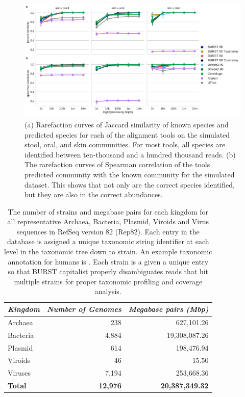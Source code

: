 \begin{figure}[hbt]
    \centering
    \includegraphics[width=0.8\linewidth]{fig/simulations_js.pdf}
    \caption{
          (a) Rarefaction curves of Jaccard similarity of known species and predicted species for each of the alignment tools on the simulated stool, oral, and skin communities. For most tools, all species are identified between ten-thousand and a hundred thousand reads. (b) The rarefaction curves of Spearman correlation of the tools predicted community with the known community for the simulated dataset. This shows that not only are the correct species identified, but they are also in the correct abundances. 
    }
    \label{fig:simulations_js}
\end{figure}

\begin{table}[hbt]
  \centering
  \begin{tabular}{l|r|r}
      \textit{Kingdom} & \textit{Number of Genomes} & \textit{Megabase pairs (Mbp)} \\ \hline
      Archaea & 238 & 627,101.26\\ \hline
      Bacteria & 4,884 & 19,308,087.26\\ \hline
      Plasmid & 614 & 198,476.94\\ \hline
      Viroids & 46 & 15.50\\ \hline
      Viruses & 7,194 & 253,668.36\\ \hline \hline
      \textbf{Total} & \textbf{12,976} & \textbf{20,387,349.32}\\ 
  \end{tabular}
  \caption{
        The number of strains and megabase pairs for each kingdom for all representative Archaea, Bacteria, Plasmid, Viroids and Virus sequences in RefSeq version 82 (Rep82). Each entry in the database is assigned a unique taxonomic string identifier at each level in the taxonomic tree down to strain. An example taxonomic annotation for humans is . Each strain is a given a unique entry so that BURST capitalist properly disambiguates reads that hit multiple strains for proper taxonomic profiling and coverage analysis. 
  }
  \label{tab:database_stats}
\end{table}

